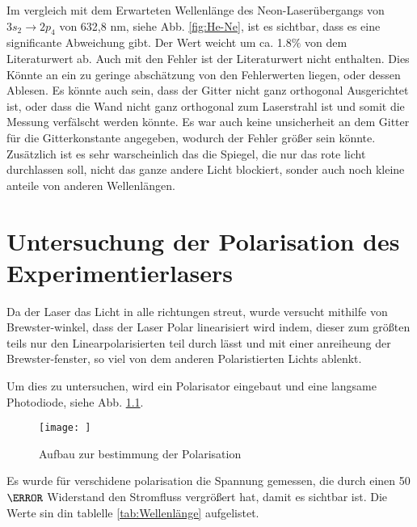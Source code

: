 Im vergleich mit dem Erwarteten Wellenlänge des Neon-Laserübergangs von $3s_2 \rightarrow 2p_4$ von 632,8 nm, siehe Abb. \ref{fig:He-Ne}, ist es sichtbar, dass es eine significante Abweichung gibt. 
Der Wert weicht um ca. 1.8$\%$ von dem Literaturwert ab. 
Auch mit den Fehler ist der Literaturwert nicht enthalten.
Dies Könnte an ein zu geringe abschätzung von den Fehlerwerten liegen, oder dessen Ablesen.
Es könnte auch sein, dass der Gitter nicht ganz orthogonal Ausgerichtet ist, oder dass die Wand nicht ganz orthogonal zum Laserstrahl ist und somit die Messung verfälscht werden könnte. 
Es war auch keine unsicherheit an dem Gitter für die Gitterkonstante angegeben, wodurch der Fehler größer sein könnte. 
Zusätzlich ist es sehr warscheinlich das die Spiegel, die nur das rote licht durchlassen soll, nicht das ganze andere Licht blockiert, sonder auch noch kleine anteile von anderen Wellenlängen.



\chapter{Untersuchung der Polarisation des Experimentierlasers}

Da der Laser das Licht in alle richtungen streut, wurde versucht mithilfe von Brewster-winkel, dass der Laser Polar linearisiert wird indem, dieser zum größten teils nur den Linearpolarisierten teil durch lässt und mit einer anreiheung der Brewster-fenster, so viel von dem anderen Polaristierten Lichts ablenkt. 

Um dies zu untersuchen, wird ein Polarisator eingebaut und eine langsame Photodiode, siehe Abb. \ref{fig:Polar}.

\begin{figure}
    \centering
    \texttt{[image: ]}
    \caption{Aufbau zur bestimmung der Polarisation}
    \label{fig:Polar}
\end{figure}

Es wurde für verschidene polarisation die Spannung gemessen, die durch einen 50 $ \ohm $ Widerstand den Stromfluss vergrößert hat, damit es sichtbar ist.
Die Werte sin din tablelle \ref{tab:Wellenlänge} aufgelistet.

